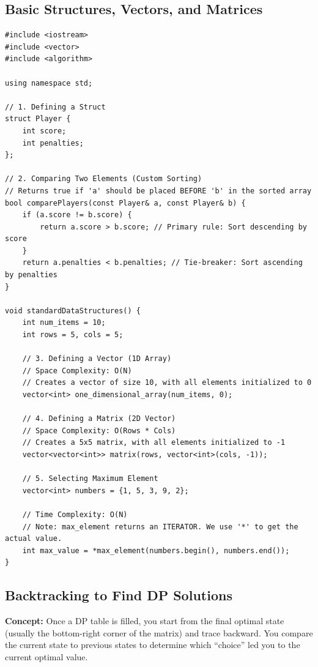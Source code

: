 \subsection{Basic Structures, Vectors, and Matrices}
\begin{lstlisting}
#include <iostream>
#include <vector>
#include <algorithm>

using namespace std;

// 1. Defining a Struct
struct Player {
    int score;
    int penalties;
};

// 2. Comparing Two Elements (Custom Sorting)
// Returns true if 'a' should be placed BEFORE 'b' in the sorted array
bool comparePlayers(const Player& a, const Player& b) {
    if (a.score != b.score) {
        return a.score > b.score; // Primary rule: Sort descending by score
    }
    return a.penalties < b.penalties; // Tie-breaker: Sort ascending by penalties
}

void standardDataStructures() {
    int num_items = 10;
    int rows = 5, cols = 5;

    // 3. Defining a Vector (1D Array)
    // Space Complexity: O(N)
    // Creates a vector of size 10, with all elements initialized to 0
    vector<int> one_dimensional_array(num_items, 0); 

    // 4. Defining a Matrix (2D Vector)
    // Space Complexity: O(Rows * Cols)
    // Creates a 5x5 matrix, with all elements initialized to -1
    vector<vector<int>> matrix(rows, vector<int>(cols, -1));

    // 5. Selecting Maximum Element
    vector<int> numbers = {1, 5, 3, 9, 2};
    
    // Time Complexity: O(N)
    // Note: max_element returns an ITERATOR. We use '*' to get the actual value.
    int max_value = *max_element(numbers.begin(), numbers.end());
}
\end{lstlisting}

\subsection{Backtracking to Find DP Solutions}
\textbf{Concept:} Once a DP table is filled, you start from the final optimal state (usually the bottom-right corner of the matrix) and trace backward. You compare the current state to previous states to determine which ``choice'' led you to the current optimal value.

